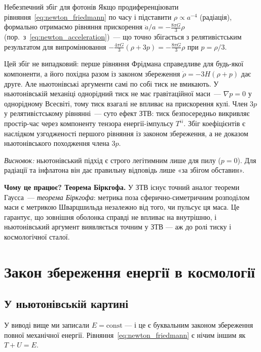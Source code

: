 \begin{keybox}{Небезпечний збіг для фотонів}
Якщо продиференціювати рівняння~\eqref{eq:newton_friedmann}
по часу і підставити $\rho \propto a^{-4}$ (радіація),
формально отримаємо рівняння прискорення
$\ddot{a}/a = -\frac{8\pi G}{3}\rho$
(пор.\ з~\eqref{eq:newton_acceleration})~---
що точно збігається з релятивістським результатом для
випромінювання $-\frac{4\pi G}{3}(\rho + 3p) =
-\frac{8\pi G}{3}\rho$ при $p = \rho/3$.

Цей збіг не випадковий: перше рівняння Фрідмана справедливе для будь-якої компоненти, а його похідна разом із законом збереження $\dot\rho=-3H(\rho+p)$ дає друге. Але ньютонівські аргументи самі по собі тиск не вмикають.
У ньютонівській механіці однорідний тиск не має
гравітаційної маси~--- $\nabla p = 0$ у однорідному
Всесвіті, тому тиск взагалі не впливає на прискорення
кулі. Член $3p$ у релятивістському рівнянні~--- суто
ефект ЗТВ: тиск безпосередньо викривляє простір-час
через компоненту тензора енергії-імпульсу $T^{ii}$.
Збіг коефіцієнтів є наслідком узгодженості першого рівняння із законом збереження, а не доказом ньютонівського походження члена $3p$.

\textit{Висновок:} ньютонівський підхід є строго
легітимним лише для пилу ($p = 0$). Для радіації та
інфлатона він дає правильну відповідь лише «за
збігом обставин».
\end{keybox}

\textbf{Чому це працює? Теорема Біркгофа.}
У ЗТВ існує точний аналог теореми Гаусса~---
\emph{теорема Біркгофа}: метрика поза сферично-симетричним
розподілом маси є метрикою Шварцшильда незалежно від того,
чи пульсує ця маса. Це гарантує, що зовнішня оболонка справді
не впливає на внутрішню, і ньютонівський аргумент виявляється
точним у ЗТВ --- аж до ролі тиску і космологічної сталої.

\section{Закон збереження енергії в космології}

\subsection*{У ньютонівській картині}

У виводі вище ми записали $E = \text{const}$ --- і це є
буквальним законом збереження повної механічної енергії.
Рівняння~\eqref{eq:newton_friedmann} є нічим іншим як
$T + U = E$.

